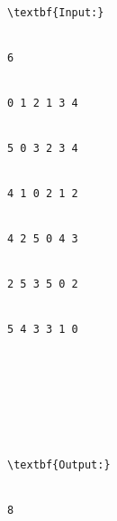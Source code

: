 \begin{verbatim}
\textbf{Input:}


6


0 1 2 1 3 4 


5 0 3 2 3 4 


4 1 0 2 1 2 


4 2 5 0 4 3 


2 5 3 5 0 2 


5 4 3 3 1 0 








\textbf{Output:}


8


\end{verbatim}
